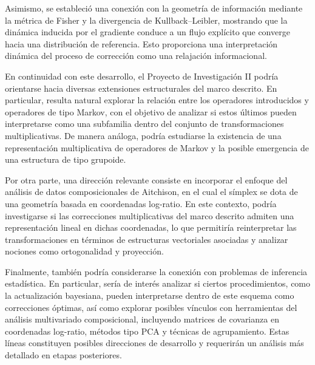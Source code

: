 \documentclass[12pt]{article}
\begin{document}
Asimismo, se estableció una conexión con la geometría de información mediante la métrica de Fisher y la divergencia de Kullback--Leibler, mostrando que la dinámica inducida por el gradiente conduce a un flujo explícito que converge hacia una distribución de referencia. Esto proporciona una interpretación dinámica del proceso de corrección como una relajación informacional.

En continuidad con este desarrollo, el Proyecto de Investigación II podría orientarse hacia diversas extensiones estructurales del marco descrito. En particular, resulta natural explorar la relación entre los operadores introducidos y operadores de tipo Markov, con el objetivo de analizar si estos últimos pueden interpretarse como una subfamilia dentro del conjunto de transformaciones multiplicativas. De manera análoga, podría estudiarse la existencia de una representación multiplicativa de operadores de Markov y la posible emergencia de una estructura de tipo grupoide.

Por otra parte, una dirección relevante consiste en incorporar el enfoque del análisis de datos composicionales de Aitchison, en el cual el símplex se dota de una geometría basada en coordenadas log-ratio. En este contexto, podría investigarse si las correcciones multiplicativas del marco descrito admiten una representación lineal en dichas coordenadas, lo que permitiría reinterpretar las transformaciones en términos de estructuras vectoriales asociadas y analizar nociones como ortogonalidad y proyección.

Finalmente, también podría considerarse la conexión con problemas de inferencia estadística. En particular, sería de interés analizar si ciertos procedimientos, como la actualización bayesiana, pueden interpretarse dentro de este esquema como correcciones óptimas, así como explorar posibles vínculos con herramientas del análisis multivariado composicional, incluyendo matrices de covarianza en coordenadas log-ratio, métodos tipo PCA y técnicas de agrupamiento. Estas líneas constituyen posibles direcciones de desarrollo y requerirán un análisis más detallado en etapas posteriores.
\clearpage


\end{document}
